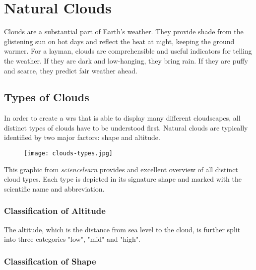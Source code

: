 \section{Natural Clouds}
Clouds are a substantial part of Earth's weather. They provide shade from the glistening sun on hot days and reflect the heat at night, keeping the ground warmer.
For a layman, clouds are comprehensible and useful indicators for telling the weather. If they are dark and low-hanging, they bring rain. If they are puffy and scarce, they predict fair weather ahead.

\subsection{Types of Clouds}
In order to create a \gls{wrs} that is able to display many different cloudscapes, all distinct types of clouds have to be understood first.
Natural clouds are typically identified by two major factors: shape and \gls{altitude}.

\begin{figure}[H]
    \texttt{[image: clouds-types.jpg]}
    \label{img:ui:mockup:live}
\end{figure}

\noindent
This graphic from \emph{sciencelearn} provides and excellent overview of all distinct cloud types.
Each type is depicted in its signature shape and marked with the scientific name and abbreviation.

\subsubsection{Classification of Altitude}
The \gls{altitude}, which is the distance from sea level to the cloud, is further split into three categories "low", "mid" and "high". 

\subsubsection{Classification of Shape}